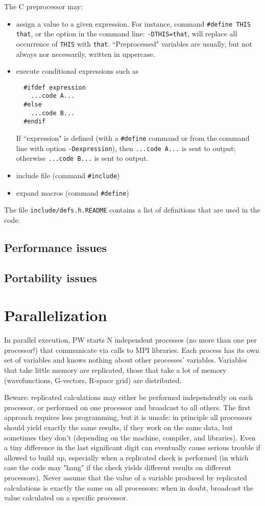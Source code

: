 \documentclass[12pt,a4paper]{article}
\begin{document}
The C preprocessor may:
\begin{itemize}
  \item
    assign a value to a given expression. For instance, command
    \texttt{\#define THIS that}, or the option in the command line:
    \texttt{-DTHIS=that}, will replace all occurrence of \texttt{THIS}
    with \texttt{that}.
    ``Preprocessed" variables are usually, but not always nor 
    necessarily,  written in uppercase.
  \item
    execute conditional expressions such as
\begin{verbatim}
  #ifdef expression
    ...code A...
  #else
    ...code B...
  #endif
\end{verbatim}
    If ``expression" is defined (with a \texttt{\#define} command or
    from the command line with option \texttt{-Dexpression}), then
    \texttt{...code A...} is sent to output; otherwise
    \texttt{...code B...} is sent to output.
  \item
    include file (command \texttt{\#include})
  \item
    expand macros (command \texttt{\#define})
\end{itemize}
The file \texttt{include/defs.h.README} contains a list of definitions
that are used in the code.

\subsection{Performance issues}
\subsection{Portability issues}

\section{Parallelization}

In parallel execution, PW starts N independent
processes (no more than one per processor!)
that communicate via calls to MPI libraries. 
Each process has its own set of variables and knows 
nothing about other processes' variables. Variables 
that take little memory are replicated, those that 
take a lot of memory (wavefunctions, G-vectors, R-space
grid) are distributed.

Beware: replicated calculations may either be performed independently
on each processor, or performed on one processor and broadcast to all
others. The first approach requires less programming, but it is unsafe:
in principle all processors should yield exactly the same results, if 
they work on the same data, but sometimes they don't (depending on the 
machine, compiler, and libraries). Even a tiny difference in the last
significant digit can eventually cause serious trouble if allowed to 
build up, especially when a replicated check is performed (in which 
case the code may "hang" if the check yields different results on 
different processors). Never assume that the value of a variable 
produced by replicated calculations is exactly the same on all processors: 
when in doubt, broadcast the value calculated on a specific processor.
\end{document}
